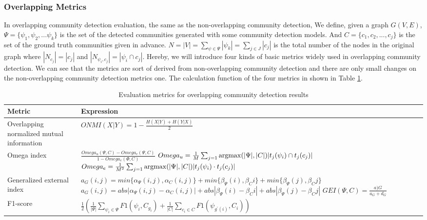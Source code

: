 \subsubsection{Overlapping Metrics}
In overlapping community detection evaluation, the same as the non-overlapping community detection,
We define, given a graph $G(V,E)$,  $\Psi = \{\psi_{1},\psi_{2},...\psi_{k}\}$ is the set of the detected communities generated with some community detection models. And $C = \{c_{1},c_{2},...,c_{j}\}$ is the set of the ground truth communities given in advance. $N = |V| = \sum_{\psi \in \Psi}|\psi_{k}|= \sum_{j \in J}|c_{j}|$  is the total number of the nodes in the original graph where $|N_{c_{j}}| = |c_{j}|$ and $|N_{\psi_{i},c_{j}}| = |\psi_{i} \cap c_{j}|$. Hereby, we will introduce four kinds of basic metrics widely used in overlapping community detection. We can see that the metrics are sort of derived from non-overlapping community detection and there are only small changes on the non-overlapping community detection metrics one. The calculation function of the four metrics in shown in Table \ref{tab:overlapping-metric}.
\begin{table}
	\centering
	\begin{tabular}{|p{8cm}|p{6cm}|} \hline
		\textbf{Metric} &  \textbf{Expression}    \\ \hline
		
		
		Overlapping normalized mutual information &$ONMI(X|Y) = 1 - \frac{H(X|Y)+H(Y|X)}{2}$  \\ \hline 
		Omega index & $\frac{Omega_{u}(\Psi,C)-Omega_{e}(\Psi,C)}{1-Omega_{e}(\Phi,C)}$ $Omega_u = \frac{1}{M}\sum_{j=1}\operatorname*{argmax} (|\Psi|,|C|)|t_{j}(\psi_{i})\cap t_{j}(c_{j})|$ $Omega_e = \frac{1}{M^2}\sum_{j=1}\operatorname*{argmax} (|\Psi|,|C|)|t_{j}(\psi_{i})\cdot t_{j}(c_{j})|$ \\ \hline 
		Generalized external index& $a_{G}(i,j) =min \{\alpha_{\Psi}(i,j),\alpha_{C}(i,j)\} + min \{\beta_{\Psi}(i),\beta_{C}{i}\}+ min \{\beta_{\Psi}(j),\beta_{C}{j}\}$ $a_{G}(i,j) =abs |\alpha_{\Psi}(i,j)-\alpha_{C}(i,j)| + abs|\beta_{\Psi}(i)-\beta_{C}{i}|+ abs|\beta_{\Psi}(j)-\beta_{C}{j}|$ $GEI(\Psi,C)=\frac{a){G}}{a_{G}+d_{G}}$ \\ \hline 
		F1-score& $\frac{1}{2} (\frac{1}{|\Psi|}\sum_{\psi_{i} \in \Psi}F1(\psi_{i},C_{g_{i}})+\frac{1}{|C|}\sum_{c_{i} \in C}F1(\psi_{g^{\prime}(i)},C_{i}))$  \\ \hline  
	\end{tabular}
	\caption{Evaluation metrics for overlapping community detection results}
	\label{tab:overlapping-metric}
	
\end{table} 

